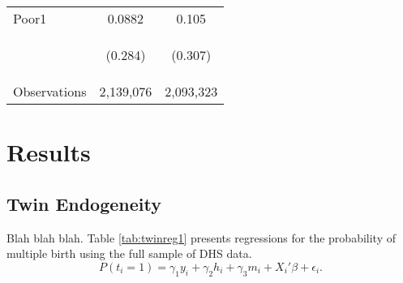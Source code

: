\documentclass{article}[11pt,subeqn]
\begin{document}
\begin{spacing}{1.25}
\begin{table}[ht]
\begin{center}
\begin{tabular}{lcc}
Poor1 & 0.0882 & 0.105\\
\begin{footnotesize}\end{footnotesize} & \begin{footnotesize}(0.284)\end{footnotesize} & \begin{footnotesize}(0.307)\end{footnotesize} \\ \midrule
Observations & 2,139,076 &  2,093,323  \\ \bottomrule
\end{tabular}
\end{center}
\end{table}

  
\section{Results}
\label{sec:results}
\subsection{Twin Endogeneity}
\label{sec:twinendog}
Blah blah blah.  Table \ref{tab:twinreg1} presents regressions for the probability of multiple birth using the full sample of DHS data.
\begin{equation}
\label{eqn:twinpred}
P(t_i=1)=\gamma_1 y_i + \gamma_2 h_i + \gamma_3 m_i +X_i'\beta + \epsilon_i.
\end{equation}


\end{spacing}
\end{document}
